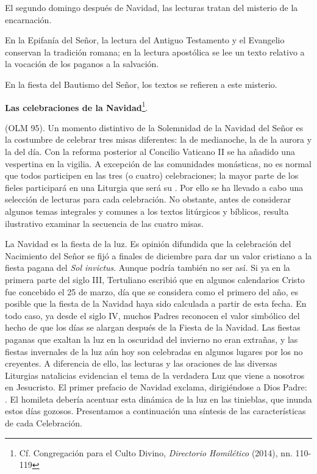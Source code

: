 El segundo domingo después de Navidad, las lecturas tratan del misterio de la encarnación.

En la Epifanía del Señor, la lectura del Antiguo Testamento y el Evangelio conservan la tradición romana; en la lectura apostólica se lee un texto relativo a la vocación de los paganos a la salvación.

En la fiesta del Bautismo del Señor, los textos se refieren a este misterio.

\textbf{Las celebraciones de la Navidad}\footnote{Cf. Congregación para el Culto Divino, \emph{Directorio Homilético} (2014), nn. 110-119}.

 (OLM 95). Un momento distintivo de la Solemnidad de la Navidad del Señor es la costumbre de celebrar tres misas diferentes: la de medianoche, la de la aurora y la del día. Con la reforma posterior al Concilio Vaticano II se ha añadido una vespertina en la vigilia. A excepción de las comunidades monásticas, no es normal que todos participen en las tres (o cuatro) celebraciones; la mayor parte de los fieles participará en una Liturgia que será su . Por ello se ha llevado a cabo una selección de lecturas para cada celebración. No obstante, antes de considerar algunos temas integrales y comunes a los textos litúrgicos y bíblicos, resulta ilustrativo examinar la secuencia de las cuatro misas.

La Navidad es la fiesta de la luz. Es opinión difundida que la celebración del Nacimiento del Señor se fijó a finales de diciembre para dar un valor cristiano a la fiesta pagana del \emph{Sol invictus}. Aunque podría también no ser así. Si ya en la primera parte del siglo III, Tertuliano escribió que en algunos calendarios Cristo fue concebido el 25 de marzo, día que se considera como el primero del año, es posible que la fiesta de la Navidad haya sido calculada a partir de esta fecha. En todo caso, ya desde el siglo IV, muchos Padres reconocen el valor simbólico del hecho de que los días se alargan después de la Fiesta de la Navidad. Las fiestas paganas que exaltan la luz en la oscuridad del invierno no eran extrañas, y las fiestas invernales de la luz aún hoy son celebradas en algunos lugares por los no creyentes. A diferencia de ello, las lecturas y las oraciones de las diversas Liturgias natalicias evidencian el tema de la verdadera Luz que viene a nosotros en Jesucristo. El primer prefacio de Navidad exclama, dirigiéndose a Dios Padre: . El homileta debería acentuar esta dinámica de la luz en las tinieblas, que inunda estos días gozosos. Presentamos a continuación una síntesis de las características de cada Celebración.

